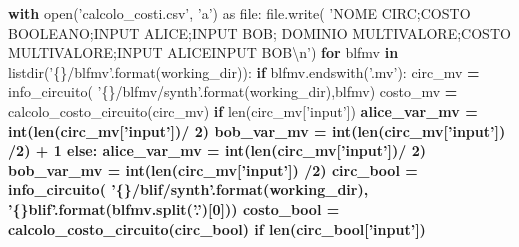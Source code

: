 \documentclass[italian,]{book}
\newenvironment{Shaded}{\begin{snugshade}}{\end{snugshade}}
\newcommand{\BuiltInTok}[1]{#1}
\newcommand{\CharTok}[1]{\textcolor[rgb]{0.31,0.60,0.02}{#1}}
\newcommand{\ControlFlowTok}[1]{\textcolor[rgb]{0.13,0.29,0.53}{\textbf{#1}}}
\newcommand{\DecValTok}[1]{\textcolor[rgb]{0.00,0.00,0.81}{#1}}
\newcommand{\ImportTok}[1]{#1}
\newcommand{\KeywordTok}[1]{\textcolor[rgb]{0.13,0.29,0.53}{\textbf{#1}}}
\newcommand{\NormalTok}[1]{#1}
\newcommand{\OperatorTok}[1]{\textcolor[rgb]{0.81,0.36,0.00}{\textbf{#1}}}
\newcommand{\SpecialCharTok}[1]{\textcolor[rgb]{0.00,0.00,0.00}{#1}}
\newcommand{\StringTok}[1]{\textcolor[rgb]{0.31,0.60,0.02}{#1}}
\begin{document}
\begin{Shaded}
\begin{Highlighting}[]
\ControlFlowTok{with} \BuiltInTok{open}\NormalTok{(}\StringTok{'calcolo_costi.csv'}\NormalTok{, }\StringTok{'a'}\NormalTok{) }\ImportTok{as} \BuiltInTok{file}\NormalTok{:}
  \BuiltInTok{file}\NormalTok{.write(}
    \StringTok{'NOME CIRC;COSTO BOOLEANO;INPUT ALICE;INPUT BOB;}
\StringTok{    DOMINIO MULTIVALORE;COSTO MULTIVALORE;INPUT ALICEINPUT BOB}\CharTok{\textbackslash{}n}\StringTok{'}\NormalTok{)}
  \ControlFlowTok{for}\NormalTok{ blfmv }\KeywordTok{in}\NormalTok{ listdir(}\StringTok{'}\SpecialCharTok{\{\}}\StringTok{/blfmv'}\NormalTok{.}\BuiltInTok{format}\NormalTok{(working_dir)):}
    \ControlFlowTok{if}\NormalTok{ blfmv.endswith(}\StringTok{'.mv'}\NormalTok{):}
\NormalTok{      circ_mv }\OperatorTok{=}\NormalTok{ info_circuito(}
          \StringTok{'}\SpecialCharTok{\{\}}\StringTok{/blfmv/synth'}\NormalTok{.}\BuiltInTok{format}\NormalTok{(working_dir),blfmv)}
\NormalTok{      costo_mv }\OperatorTok{=}\NormalTok{ calcolo_costo_circuito(circ_mv)}
      \ControlFlowTok{if} \BuiltInTok{len}\NormalTok{(circ_mv[}\StringTok{'input'}\NormalTok{]) }\OperatorTok{%
\NormalTok{          alice_var_mv }\OperatorTok{=} \BuiltInTok{int}\NormalTok{(}\BuiltInTok{len}\NormalTok{(circ_mv[}\StringTok{'input'}\NormalTok{])}\OperatorTok{/} \DecValTok{2}\NormalTok{)}
\NormalTok{          bob_var_mv }\OperatorTok{=} \BuiltInTok{int}\NormalTok{(}\BuiltInTok{len}\NormalTok{(circ_mv[}\StringTok{'input'}\NormalTok{]) }\OperatorTok{/}\DecValTok{2}\NormalTok{) }\OperatorTok{+} \DecValTok{1}
      \ControlFlowTok{else}\NormalTok{:}
\NormalTok{          alice_var_mv }\OperatorTok{=} \BuiltInTok{int}\NormalTok{(}\BuiltInTok{len}\NormalTok{(circ_mv[}\StringTok{'input'}\NormalTok{])}\OperatorTok{/} \DecValTok{2}\NormalTok{)}
\NormalTok{          bob_var_mv }\OperatorTok{=} \BuiltInTok{int}\NormalTok{(}\BuiltInTok{len}\NormalTok{(circ_mv[}\StringTok{'input'}\NormalTok{]) }\OperatorTok{/}\DecValTok{2}\NormalTok{)}
\NormalTok{      circ_bool }\OperatorTok{=}\NormalTok{ info_circuito(}
          \StringTok{'}\SpecialCharTok{\{\}}\StringTok{/blif/synth'}\NormalTok{.}\BuiltInTok{format}\NormalTok{(working_dir), }\StringTok{'}\SpecialCharTok{\{\}}\StringTok{blif'}\NormalTok{.}\BuiltInTok{format}\NormalTok{(blfmv.split(}\StringTok{'.'}\NormalTok{)[}\DecValTok{0}\NormalTok{]))}
\NormalTok{      costo_bool }\OperatorTok{=}\NormalTok{ calcolo_costo_circuito(circ_bool)}
      \ControlFlowTok{if} \BuiltInTok{len}\NormalTok{(circ_bool[}\StringTok{'input'}\NormalTok{]) }\OperatorTok{%
}}
\end{Highlighting}
\end{Shaded}
\end{document}
